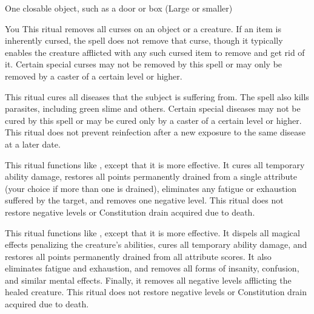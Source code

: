 \begin{spelltarget}{One closable object, such as a door or box (Large or smaller)}
\begin{spelltarget}{You}
\spelleffect This ritual removes all curses on an object or a creature. If an item is inherently cursed, the spell does not remove that curse, though it typically enables the creature afflicted with any such cursed item to remove and get rid of it. Certain special curses may not be removed by this spell or may only be removed by a caster of a certain level or higher.

\spelleffect This ritual cures all diseases that the subject is suffering from. The spell also kills parasites, including green slime and others. Certain special diseases may not be cured by this spell or may be cured only by a caster of a certain level or higher.
\spellnotes This ritual does not prevent reinfection after a new exposure to the same disease at a later date.

\spelleffect This ritual functions like , except that it is more effective. It cures all temporary ability damage, restores all points permanently drained from a single attribute (your choice if more than one is drained), eliminates any fatigue or exhaustion suffered by the target, and removes one negative level.
\spellnotes This ritual does not restore negative levels or Constitution drain acquired due to death.

\spelleffect This ritual functions like , except that it is more effective. It dispels all magical effects penalizing the creature's abilities, cures all temporary ability damage, and restores all points permanently drained from all attribute scores. It also eliminates fatigue and exhaustion, and removes all forms of insanity, confusion, and similar mental effects. Finally, it removes all negative levels afflicting the healed creature. 
\spellnotes This ritual does not restore negative levels or Constitution drain acquired due to death.


\end{spelltarget}
\end{spelltarget}
